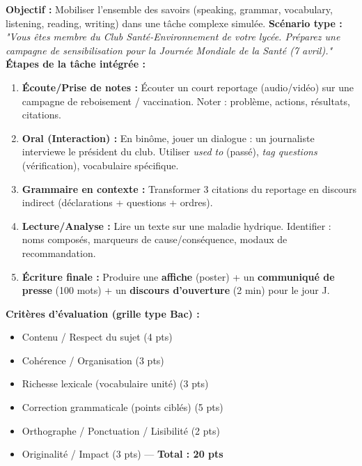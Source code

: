 \documentclass[11pt]{article}
\begin{document}
\begin{methode}
\textbf{Objectif :} Mobiliser l'ensemble des savoirs (speaking, grammar, vocabulary, listening, reading, writing) dans une tâche complexe simulée.
\medskip
\textbf{Scénario type :} \emph{"Vous êtes membre du Club Santé-Environnement de votre lycée. Préparez une campagne de sensibilisation pour la Journée Mondiale de la Santé (7 avril)."}
\medskip
\textbf{Étapes de la tâche intégrée :}
\begin{enumerate}
    \item \textbf{Écoute/Prise de notes :} Écouter un court reportage (audio/vidéo) sur une campagne de reboisement / vaccination. Noter : problème, actions, résultats, citations.
    \item \textbf{Oral (Interaction) :} En binôme, jouer un dialogue : un journaliste interviewe le président du club. Utiliser \emph{used to} (passé), \emph{tag questions} (vérification), vocabulaire spécifique.
    \item \textbf{Grammaire en contexte :} Transformer 3 citations du reportage en discours indirect (déclarations + questions + ordres).
    \item \textbf{Lecture/Analyse :} Lire un texte sur une maladie hydrique. Identifier : noms composés, marqueurs de cause/conséquence, modaux de recommandation.
    \item \textbf{Écriture finale :} Produire une \textbf{affiche} (poster) + un \textbf{communiqué de presse} (100 mots) + un \textbf{discours d'ouverture} (2 min) pour le jour J.
\end{enumerate}
\textbf{Critères d'évaluation (grille type Bac) :}
\begin{itemize}
    \item Contenu / Respect du sujet (4 pts)
    \item Cohérence / Organisation (3 pts)
    \item Richesse lexicale (vocabulaire unité) (3 pts)
    \item Correction grammaticale (points ciblés) (5 pts)
    \item Orthographe / Ponctuation / Lisibilité (2 pts)
    \item Originalité / Impact (3 pts) — \textbf{Total : 20 pts}
\end{itemize}
\end{methode}
\end{document}
